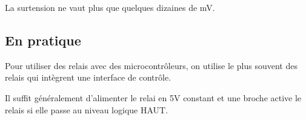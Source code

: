 La surtension ne vaut plus que quelques dizaines de mV.


\subsection{En pratique}

Pour utiliser des relais avec des microcontrôleurs, on utilise le plus souvent des relais qui intègrent une interface de contrôle.\\


Il suffit généralement d'alimenter le relai en 5V constant et une broche active le relais si elle passe au niveau logique HAUT.

